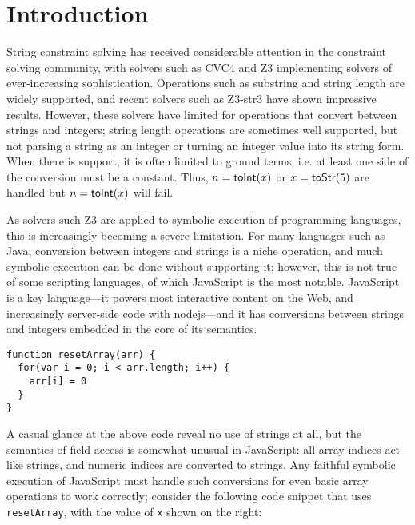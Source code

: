 \documentclass[sigplan,review,anonymous]{acmart}\settopmatter{printfolios=true,printccs=false,printacmref=false}
\begin{document}
\section{Introduction} \label{section:introduction}



String constraint solving has received considerable attention in the constraint solving community, with solvers such as CVC4 and Z3 implementing solvers of ever-increasing sophistication.  Operations such as substring and string length are widely supported, and recent solvers such as Z3-str3 have shown impressive results.  However, these solvers have limited for operations that convert between strings and integers; string length operations are sometimes well supported, but not parsing a string as an integer or turning an integer value into its string form.  When there is support, it is often limited to ground terms, i.e. at least one side of the conversion must be a constant.  Thus, $n = \mbox{\textsf{toInt}($x$)}$ or $x = \mbox{\textsf{toStr}($5$)}$ are handled but $n = \mbox{\textsf{toInt}($x$)}$ will fail.

As solvers such Z3 are applied to symbolic execution of programming languages, this is increasingly becoming a severe limitation.  For many languages such as Java, conversion between integers and strings is a niche operation, and much symbolic execution can be done without supporting it; however, this is not true of some scripting languages, of which JavaScript is the most notable.  JavaScript is a key language---it powers most interactive content on the Web, and increasingly server-side code with nodejs---and it has conversions between strings and integers embedded in the core of its semantics.

\begin{verbatim}
function resetArray(arr) {
  for(var i = 0; i < arr.length; i++) {
    arr[i] = 0
  }
}
\end{verbatim}



A casual glance at the above code reveal no use of strings at all, but the semantics of field access is somewhat unusual in JavaScript: all array indices act like strings, and numeric indices are converted to strings.  Any faithful symbolic execution of JavaScript must handle such conversions for even basic array operations to work correctly; consider the following code snippet that uses {\tt{resetArray}}, with the value of {\tt{x}} shown on the right:
\end{document}
